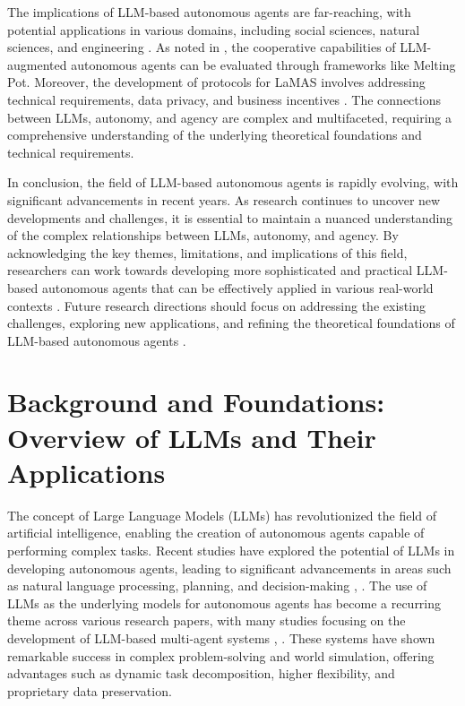 \documentclass[conference]{IEEEtran}
\begin{document}
The implications of LLM-based autonomous agents are far-reaching, with potential applications in various domains, including social sciences, natural sciences, and engineering \cite{2308.11432, 2411.14033}. As noted in \cite{2403.11381}, the cooperative capabilities of LLM-augmented autonomous agents can be evaluated through frameworks like Melting Pot. Moreover, the development of protocols for LaMAS involves addressing technical requirements, data privacy, and business incentives \cite{2411.14033}. The connections between LLMs, autonomy, and agency are complex and multifaceted, requiring a comprehensive understanding of the underlying theoretical foundations and technical requirements.

In conclusion, the field of LLM-based autonomous agents is rapidly evolving, with significant advancements in recent years. As research continues to uncover new developments and challenges, it is essential to maintain a nuanced understanding of the complex relationships between LLMs, autonomy, and agency. By acknowledging the key themes, limitations, and implications of this field, researchers can work towards developing more sophisticated and practical LLM-based autonomous agents that can be effectively applied in various real-world contexts \cite{2407.10735, 2411.14033}. Future research directions should focus on addressing the existing challenges, exploring new applications, and refining the theoretical foundations of LLM-based autonomous agents \cite{2308.11432, 2405.11106}.

\section{Background and Foundations: Overview of LLMs and Their Applications}
The concept of Large Language Models (LLMs) has revolutionized the field of artificial intelligence, enabling the creation of autonomous agents capable of performing complex tasks. Recent studies have explored the potential of LLMs in developing autonomous agents, leading to significant advancements in areas such as natural language processing, planning, and decision-making \cite{2308.11432}, \cite{2402.02716}. The use of LLMs as the underlying models for autonomous agents has become a recurring theme across various research papers, with many studies focusing on the development of LLM-based multi-agent systems \cite{2411.14033}, \cite{2402.01680}. These systems have shown remarkable success in complex problem-solving and world simulation, offering advantages such as dynamic task decomposition, higher flexibility, and proprietary data preservation.
\end{document}
